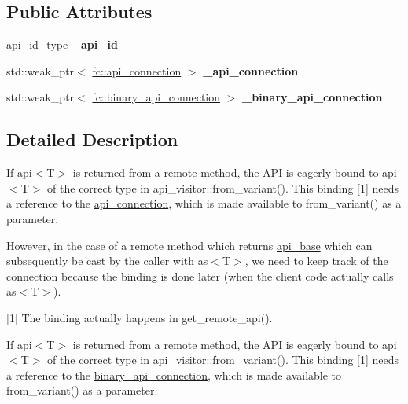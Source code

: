 \subsection*{Public Attributes}
\begin{DoxyCompactItemize}
\item 
\mbox{\label{classfc_1_1detail_1_1any__api_a534d5a13911c242a2d49a21c9785760d}} 
api\+\_\+id\+\_\+type {\bfseries \+\_\+api\+\_\+id}
\item 
\mbox{\label{classfc_1_1detail_1_1any__api_aae058b58c4a7d62908df6de21ad6a73a}} 
std\+::weak\+\_\+ptr$<$ \mbox{\hyperlink{classfc_1_1api__connection}{fc\+::api\+\_\+connection}} $>$ {\bfseries \+\_\+api\+\_\+connection}
\item 
\mbox{\label{classfc_1_1detail_1_1any__api_a623cda476ceed1743d3e4b7b1bd86e61}} 
std\+::weak\+\_\+ptr$<$ \mbox{\hyperlink{classfc_1_1binary__api__connection}{fc\+::binary\+\_\+api\+\_\+connection}} $>$ {\bfseries \+\_\+binary\+\_\+api\+\_\+connection}
\end{DoxyCompactItemize}


\subsection{Detailed Description}
If api$<$\+T$>$ is returned from a remote method, the A\+PI is eagerly bound to api$<$\+T$>$ of the correct type in api\+\_\+visitor\+::from\+\_\+variant(). This binding \mbox{[}1\mbox{]} needs a reference to the \mbox{\hyperlink{classfc_1_1api__connection}{api\+\_\+connection}}, which is made available to from\+\_\+variant() as a parameter.

However, in the case of a remote method which returns \mbox{\hyperlink{classfc_1_1api__base}{api\+\_\+base}} which can subsequently be cast by the caller with as$<$\+T$>$, we need to keep track of the connection because the binding is done later (when the client code actually calls as$<$\+T$>$).

\mbox{[}1\mbox{]} The binding actually happens in get\+\_\+remote\+\_\+api().

If api$<$\+T$>$ is returned from a remote method, the A\+PI is eagerly bound to api$<$\+T$>$ of the correct type in api\+\_\+visitor\+::from\+\_\+variant(). This binding \mbox{[}1\mbox{]} needs a reference to the \mbox{\hyperlink{classfc_1_1binary__api__connection}{binary\+\_\+api\+\_\+connection}}, which is made available to from\+\_\+variant() as a parameter.

